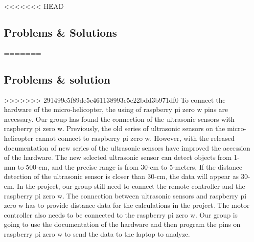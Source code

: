 \documentclass[onecolumn, draftclsnofoot,10pt, compsoc]{IEEEtran}
\begin{document}
<<<<<<< HEAD
\subsection{Problems \& Solutions}
=======
\subsection{Problems \& solution}
>>>>>>> 291499e5f89de5c461138993c5e22bdd3b971df0
To connect the hardware of the micro-helicopter, the using of raspberry pi zero w pins are necessary. Our group has found the connection of the ultrasonic sensors with raspberry pi zero w. Previously, the old series of ultrasonic sensors on the micro-helicopter cannot connect to raspberry pi zero w. However, with the released documentation of new series of the ultrasonic sensors have improved the accession of the hardware. The new selected ultrasonic sensor can detect objects from 1-mm to 500-cm, and the precise range is from 30-cm to 5-meters, If the distance detection of the ultrasonic sensor is closer than 30-cm, the data will appear as 30-cm.
In the project, our group still need to connect the remote controller and the raspberry pi zero w. The connection between ultrasonic sensors and raspberry pi zero w has to provide distance data for the calculations in the project. The motor controller also needs to be connected to the raspberry pi zero w. Our group is going to use the documentation of the hardware and then program the pins on raspberry pi zero w to send the data to the laptop to analyze.
\end{document}
